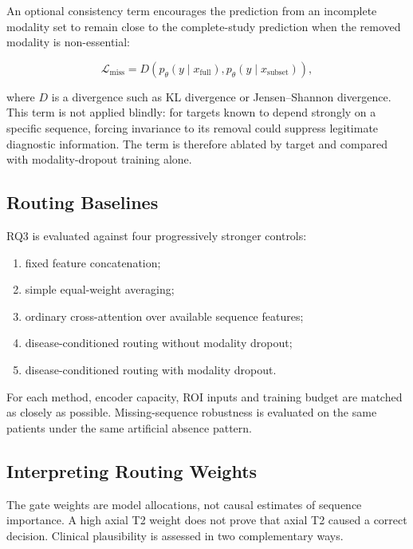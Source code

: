 An optional consistency term encourages the prediction from an incomplete
modality set to remain close to the complete-study prediction when the removed
modality is non-essential:

\begin{equation}
\mathcal{L}_{\mathrm{miss}}
=
D\!\left(
p_{\theta}(y\mid x_{\mathrm{full}}),
p_{\theta}(y\mid x_{\mathrm{subset}})
\right),
\label{eq:missing-consistency}
\end{equation}

where $D$ is a divergence such as KL divergence or Jensen--Shannon divergence.
This term is not applied blindly: for targets known to depend strongly on a
specific sequence, forcing invariance to its removal could suppress legitimate
diagnostic information. The term is therefore ablated by target and compared
with modality-dropout training alone.

\subsection{Routing Baselines}
\label{sec:method-routing-baselines}

RQ3 is evaluated against four progressively stronger controls:

\begin{enumerate}
  \item fixed feature concatenation;
  \item simple equal-weight averaging;
  \item ordinary cross-attention over available sequence features;
  \item disease-conditioned routing without modality dropout;
  \item disease-conditioned routing with modality dropout.
\end{enumerate}

For each method, encoder capacity, ROI inputs and training budget are matched as
closely as possible. Missing-sequence robustness is evaluated on the same
patients under the same artificial absence pattern.

\subsection{Interpreting Routing Weights}
\label{sec:method-routing-interpretation}

The gate weights are model allocations, not causal estimates of sequence
importance. A high axial T2 weight does not prove that axial T2 caused a correct
decision. Clinical plausibility is assessed in two complementary ways.

